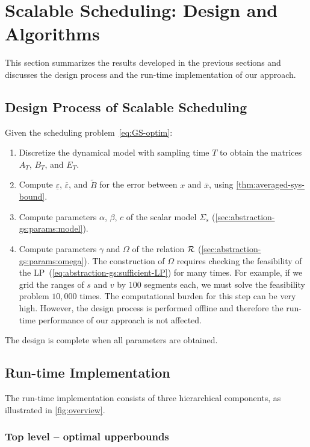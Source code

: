 \section{Scalable Scheduling: Design and Algorithms}
\label{sec:summary}

This section summarizes the results developed in the previous sections and discusses the design process and the run-time implementation of our approach.

\subsection{Design Process of Scalable Scheduling}
\label{sec:summary:design}

Given the scheduling problem~\eqref{eq:GS-optim}:
\begin{enumerate}
\item Discretize the dynamical model with sampling time $T$
  to obtain the matrices $A_{T}$, $B_{T}$, and $E_{T}$.
\item Compute $\underline{\varepsilon}$, $\overbar{\varepsilon}$, and $\tilde{B}$ for the error between $x$ and $\overbar{x}$, using \cref{thm:averaged-sys-bound}.
\item Compute parameters $\alpha$, $\beta$, $c$ of the scalar model $\Sigma_{s}$ (\cref{sec:abstraction-gs:params:model}).
\item Compute parameters $\gamma$ and $\Omega$ of the relation $\mathcal{R}$ (\cref{sec:abstraction-gs:params:omega}).  The construction of $\Omega$ requires checking the feasibility of the LP~(\ref{eq:abstraction-gs:sufficient-LP}) for many times.  For example, if we grid the ranges of $s$ and $v$ by $100$ segments each, we must solve the feasibility problem $10 \comma 000$ times.  The computational burden for this step can be very high.  However, the design process is performed offline and therefore the run-time performance of our approach is not affected.
\end{enumerate}
The design is complete when all parameters are obtained.

\subsection{Run-time Implementation}
\label{sec:summary:implementation}

The run-time implementation consists of three hierarchical components, as illustrated in \cref{fig:overview}.

\subsubsection*{Top level -- optimal upperbounds}

